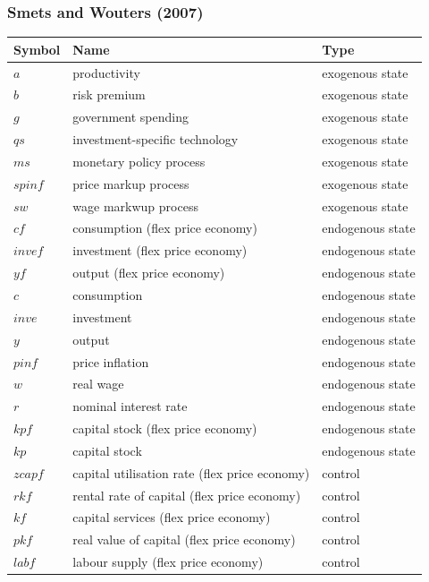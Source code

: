 \documentclass{article}
\begin{document}
\subsubsection{Smets and Wouters (2007)}

\begin{table}
  \centering
  \begin{tabular}{|l|l|l|}
    \hline
    Symbol & Name & Type \\
    \hline
    $a$ & productivity & exogenous state \\
    $b$ & risk premium & exogenous state \\
    $g$ & government spending & exogenous state \\
    $qs$ & investment-specific technology & exogenous state \\
    $ms$ & monetary policy process & exogenous state \\
    $spinf$ & price markup process & exogenous state \\
    $sw$ & wage markwup process & exogenous state \\
    $cf$ & consumption (flex price economy) & endogenous state \\
    $invef$ & investment (flex price economy) & endogenous state \\
    $yf$ & output (flex price economy) & endogenous state \\
    $c$ & consumption & endogenous state \\
    $inve$ & investment & endogenous state \\
    $y$ & output & endogenous state \\
    $pinf$ & price inflation & endogenous state \\
    $w$ & real wage & endogenous state \\
    $r$ & nominal interest rate & endogenous state \\
    $kpf$ & capital stock (flex price economy) & endogenous state \\
    $kp$ & capital stock & endogenous state \\
    $zcapf$ & capital utilisation rate (flex price economy) & control \\
    $rkf$ & rental rate of capital (flex price economy) & control \\
    $kf$ & capital services (flex price economy) & control \\
    $pkf$ & real value of capital (flex price economy) & control \\
    $labf$ & labour supply (flex price economy) & control \\

\end{tabular}
\end{table}
\end{document}
